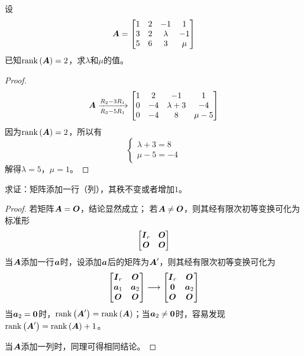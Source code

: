 \begin{problem}\label{problem-1.26}
设
\begin{equation*}
    \boldsymbol{A}=
    \begin{bmatrix}
        1 & 2 & -1      & 1   \\
        3 & 2 & \lambda & -1  \\
        5 & 6 & 3       & \mu
    \end{bmatrix}
\end{equation*}
已知\(\mathrm{rank}\left( \boldsymbol{A} \right)=2\)，求\(\lambda\)和\(\mu\)的值。
\end{problem}
\begin{proof}
    \begin{equation*}
        \boldsymbol{A}\xrightarrow[R_3-5R_1]{R_2-3R_1}
        \begin{bmatrix}
            1 & 2  & -1        & 1     \\
            0 & -4 & \lambda+3 & -4    \\
            0 & -4 & 8         & \mu-5
        \end{bmatrix}
    \end{equation*}
    因为\(\mathrm{rank}\left( \boldsymbol{A} \right)=2\)，所以有
    \begin{equation*}
        \begin{cases}
            \lambda+3=8 \\
            \mu-5=-4
        \end{cases}
    \end{equation*}
    解得\(\lambda=5\)，\(\mu=1\)。
\end{proof}

\begin{problem}\label{problem-1.27}
求证：矩阵添加一行（列），其秩不变或者增加\(1\)。
\end{problem}
\begin{proof}
    若矩阵\(\boldsymbol{A}=\boldsymbol{O}\)，结论显然成立；
    若\(\boldsymbol{A}\neq\boldsymbol{O}\)，则其经有限次初等变换可化为标准形
    \begin{equation*}
        \begin{bmatrix}\boldsymbol{I}_r&\boldsymbol{O}\\\boldsymbol{O}&\boldsymbol{O}\end{bmatrix}
    \end{equation*}
    当\(\boldsymbol{A}\)添加一行\(\boldsymbol{a}\)时，设添加\(\boldsymbol{a}\)后的矩阵为\(\boldsymbol{A}'\)，则其经有限次初等变换可化为
    \begin{equation*}
        \begin{bmatrix}\boldsymbol{I}_r&\boldsymbol{O}\\\boldsymbol{a}_1&\boldsymbol{a}_2\\\boldsymbol{O}&\boldsymbol{O}\end{bmatrix}\longrightarrow
        \begin{bmatrix}\boldsymbol{I}_r&\boldsymbol{O}\\\boldsymbol{0}&\boldsymbol{a}_2\\\boldsymbol{O}&\boldsymbol{O}\end{bmatrix}
    \end{equation*}
    当\(\boldsymbol{a}_2=\boldsymbol{0}\)时，\(\mathrm{rank}\left( \boldsymbol{A}' \right)=\mathrm{rank}\left( \boldsymbol{A} \right)\)；当\(\boldsymbol{a}_2\neq\boldsymbol{0}\)时，容易发现\(\mathrm{rank}\left( \boldsymbol{A}' \right)=\mathrm{rank}\left( \boldsymbol{A} \right)+1\)。

    当\(\boldsymbol{A}\)添加一列时，同理可得相同结论。
\end{proof}

